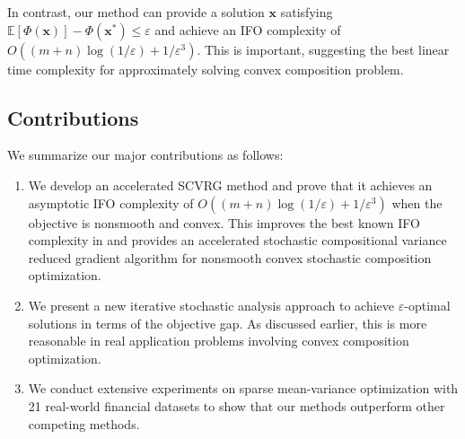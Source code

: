 \documentclass[11pt]{article}
\newcommand{\BE}{\mathbb{E}}
\newcommand{\x}{\mathbf x}
\begin{document}
In contrast, our method can provide a solution $\x$ satisfying $\BE\left[ \Phi(\x)\right] - \Phi(\x^*) \leq \varepsilon$ and achieve an IFO complexity of $O\left((m+n)\log\left(1/\varepsilon\right)+1/\varepsilon^3\right)$. This is important, suggesting the best linear time complexity for approximately solving convex composition problem.  

\subsection{Contributions}
We summarize our major contributions as follows: 
\begin{enumerate}
\item We develop an accelerated SCVRG method and prove that it achieves an asymptotic IFO complexity of $O\left((m+n)\log\left(1/\varepsilon\right)+1/\varepsilon^3\right)$ when the objective is nonsmooth and convex. This improves the best known IFO complexity in \cite{Huo-2017-Accelerated} and provides an accelerated stochastic compositional variance reduced gradient algorithm for nonsmooth convex stochastic composition optimization. 
\item We present a new iterative stochastic analysis approach to achieve $\varepsilon$-optimal solutions in terms of the objective gap. As discussed earlier, this is more reasonable in real application problems involving convex composition optimization.
\item We conduct extensive experiments on sparse mean-variance optimization with 21 real-world financial datasets to show that our methods outperform other competing methods. 
\end{enumerate}
\end{document}
